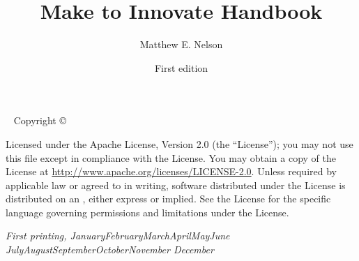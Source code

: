 \documentclass[nohyper,nobib]{tufte-book}
\title{Make to Innovate Handbook}
\date{First edition}
\author[Matthew E. Nelson]{Matthew E. Nelson}
\newcommand{\monthyear}{%
  \ifcase\month\or January\or February\or March\or April\or May\or June\or
  July\or August\or September\or October\or November\or
  December\fi\space\number\year
}
\newcommand{\openepigraph}[2]{%
  \begin{fullwidth}
  \sffamily\large
  \begin{doublespace}
  \noindent\allcaps{#1}\\%
  \noindent\allcaps{#2}%
  \end{doublespace}
  \end{fullwidth}
}
\newcommand{\blankpage}{\newpage\hbox{}\thispagestyle{empty}\newpage}
\begin{document}
\frontmatter




\maketitle


\newpage
\begin{fullwidth}
~\vfill
\thispagestyle{empty}
\setlength{\parindent}{0pt}
\setlength{\parskip}{\baselineskip}
Copyright \copyright\ \the\year\ \thanklessauthor

\par{}

\par{}

\par Licensed under the Apache License, Version 2.0 (the ``License''); you may not
use this file except in compliance with the License. You may obtain a copy
of the License at \url{http://www.apache.org/licenses/LICENSE-2.0}. Unless
required by applicable law or agreed to in writing, software distributed
under the License is distributed on an , either express or implied. See the
License for the specific language governing permissions and limitations
under the License.

\par\textit{First printing, \monthyear}
\end{fullwidth}
\end{document}
